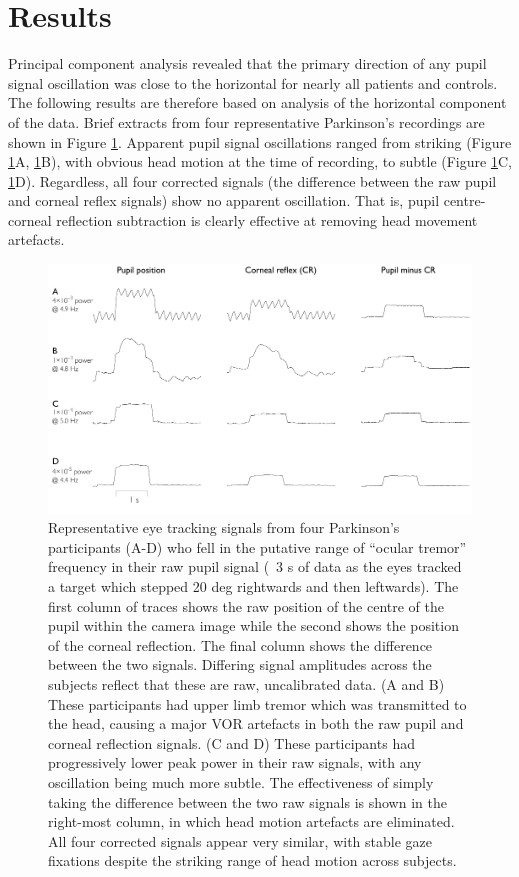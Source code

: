 \documentclass[jou,a4paper]{apa6}
\begin{document}
\section{Results}
Principal component analysis revealed that the primary direction of any pupil signal oscillation was close to the horizontal for nearly all patients and controls. The following results are therefore based on analysis of the horizontal component of the data. Brief extracts from four representative Parkinson's recordings are shown in Figure \ref{fig:traces}. Apparent pupil signal oscillations ranged from striking (Figure \ref{fig:traces}A, \ref{fig:traces}B), with obvious head motion at the time of recording, to subtle (Figure \ref{fig:traces}C, \ref{fig:traces}D). Regardless, all four corrected signals (the difference between the raw pupil and corneal reflex signals) show no apparent oscillation. That is, pupil centre-corneal reflection subtraction is clearly effective at removing head movement artefacts.

\begin{figure}[htbp]
\begin{center}
\includegraphics {Figures/Figure_2_Individual_traces}
\caption{Representative eye tracking signals from four Parkinson's participants (A-D) who fell in the putative range of ``ocular tremor'' frequency in their raw pupil signal (~3 s of data as the eyes tracked a target which stepped 20 deg rightwards and then leftwards). The first column of traces shows the raw position of the centre of the pupil within the camera image while the second shows the position of the corneal reflection. The final column shows the difference between the two signals. Differing signal amplitudes across the subjects reflect that these are raw, uncalibrated data. (A and B) These participants had upper limb tremor which was transmitted to the head, causing a major VOR artefacts in both the raw pupil and corneal reflection signals. (C and D) These participants had progressively lower peak power in their raw signals, with any oscillation being much more subtle.
The effectiveness of simply taking the difference between the two raw signals is shown in the right-most column, in which head motion artefacts are eliminated. All four corrected signals appear very similar, with stable gaze fixations despite the striking range of head motion across subjects.
}
\label{fig:traces}
\end{center}
\end{figure}
\end{document}
